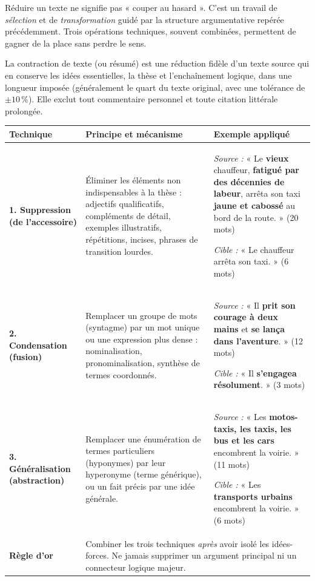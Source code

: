 \documentclass[11pt]{article}
\newcommand{\cle}[1]{{\popxbold\color{popdark}#1}}
\begin{document}
Réduire un texte ne signifie pas « couper au hasard ». C'est un travail de \emph{sélection} et de \emph{transformation} guidé par la structure argumentative repérée précédemment. Trois opérations techniques, souvent combinées, permettent de gagner de la place sans perdre le sens.

\begin{definition}
La \cle{contraction de texte} (ou résumé) est une réduction fidèle d'un texte source qui en conserve les idées essentielles, la thèse et l'enchaînement logique, dans une longueur imposée (généralement le quart du texte original, avec une tolérance de $\pm 10\,\%$). Elle exclut tout commentaire personnel et toute citation littérale prolongée.
\end{definition}

\begin{center}
\begin{tabularx}{\linewidth}{|l|X|X|}\hline
\rowcolor{popblueL} \textbf{Technique} & \textbf{Principe et mécanisme} & \textbf{Exemple appliqué} \\ \hline
\textbf{1. Suppression (de l'accessoire)} & Éliminer les éléments non indispensables à la thèse : adjectifs qualificatifs, compléments de détail, exemples illustratifs, répétitions, incises, phrases de transition lourdes. & \emph{Source :} « Le \textbf{vieux} chauffeur, \textbf{fatigué par des décennies de labeur}, arrêta son taxi \textbf{jaune et cabossé} au bord de la route. » (20 mots) \par \emph{Cible :} « Le chauffeur arrêta son taxi. » (6 mots) \\ \hline
\textbf{2. Condensation (fusion)} & Remplacer un groupe de mots (syntagme) par un mot unique ou une expression plus dense : nominalisation, pronominalisation, synthèse de termes coordonnés. & \emph{Source :} « Il \textbf{prit son courage à deux mains} et \textbf{se lança dans l'aventure}. » (12 mots) \par \emph{Cible :} « Il \textbf{s'engagea résolument}. » (3 mots) \\ \hline
\textbf{3. Généralisation (abstraction)} & Remplacer une énumération de termes particuliers (hyponymes) par leur hyperonyme (terme générique), ou un fait précis par une idée générale. & \emph{Source :} « Les \textbf{motos-taxis, les taxis, les bus et les cars} encombrent la voirie. » (11 mots) \par \emph{Cible :} « Les \textbf{transports urbains} encombrent la voirie. » (6 mots) \\ \hline
\rowcolor{popgreenL} \textbf{Règle d'or} & \multicolumn{2}{l|}{Combiner les trois techniques \emph{après} avoir isolé les idées-forces. Ne jamais supprimer un argument principal ni un connecteur logique majeur.} \\ \hline
\end{tabularx}
\end{center}
\end{document}
